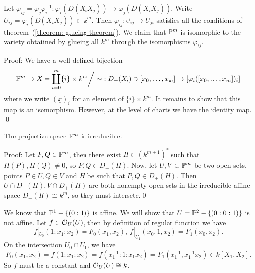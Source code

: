 \begin{dang}
    \begin{proposition}
        Let $\varphi_{ij}=\varphi_j\varphi_i^{-1}:\varphi_i(D(X_iX_j))\to\varphi_j(D(X_iX_j))$. Write 
        $U_{ij} = \varphi_i(D(X_iX_j))\subset k^m$. Then $\varphi_{ij}:U_{ij}\to U_{ji}$ satisfies all the conditions 
        of theorem~(\ref{theorem: glueing theorem}). We claim that $\mathbb{P}^m$ is isomorphic to the variety obtatined 
        by glueing all $k^m$ through the isomorphisms $\varphi_{ij}$. 
    \end{proposition}
\end{dang}
Proof: We have a well defined bijection 
\begin{equation}
    \mathbb{P}^m\rightarrow X=\coprod_{i=0}^m\{i\}\times k^{m}\bigg/\sim\;:D_+(X_i)\ni[x_0,\dots,x_m]\mapsto [\varphi_i([x_0,\dots,x_m])_i]
\end{equation}
where we write $(\underline{x})_i$ for an element of $\{i\}\times k^m$. It remains to show that this map is an isomorphism. 
However, at the level of charts we have the identity map. \qed

\begin{dang}
    \begin{proposition}
        The projective space $\mathbb{P}^m$ is irreducible.
    \end{proposition}
\end{dang}
Proof: Let $P,Q\in \mathbb{P}^m$, then there exist $H\in (k^{m+1})^*$ such that $H(P),H(Q)\neq 0$, so 
$P,Q\in D_+(H)$. Now, let $U,V\subset\mathbb{P}^m$ be two open sets, points $P\in U,Q\in V$ and 
$H$ be such that $P,Q\in D_+(H)$. Then $U\cap D_+(H), V\cap D_+(H)$ are both nonempty open sets in the irreducible 
affine space $D_+(H)\cong k^m$, so they must intersetc.\qed

\begin{remark}
    We know that $\mathbb{P}^1-\{(0:1)\}$ is affine. We will show that $U=\mathbb{P}^2-\{(0:0:1)\}$ is not affine. 
    Let $f\in\mathcal{O}_U(U)$, then by definition of regular function we have 
    \begin{equation}
        f|_{U_0}(1:x_1:x_2)=F_0(x_1,x_2),\; f|_{U_1}(x_0,1,x_2)=F_1(x_0,x_2).
    \end{equation}
    On the intersection $U_0\cap U_1$, we have 
    \begin{equation}
        F_0(x_1,x_2)=f(1:x_1:x_2)=f(x_1^{-1}:1:x_1x_2)=F_1(x_1^{-1},x_1^{-1}x_2)\in k[X_1,X_2].
    \end{equation}
    So $f$ must be a constant and $\mathcal{O}_{U}(U)\cong k$.
\end{remark}

